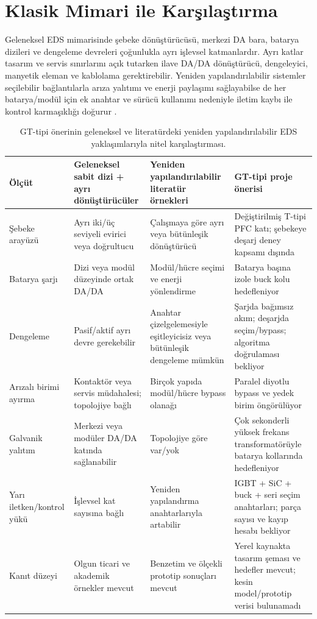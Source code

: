 \section{Klasik Mimari ile Karşılaştırma}
\label{sec:gt-karsilastirma}

Geleneksel EDS mimarisinde şebeke dönüştürücüsü, merkezi DA bara, batarya dizileri ve dengeleme devreleri çoğunlukla ayrı işlevsel katmanlardır. Ayrı katlar tasarım ve servis sınırlarını açık tutarken ilave DA/DA dönüştürücü, dengeleyici, manyetik eleman ve kablolama gerektirebilir. Yeniden yapılandırılabilir sistemler seçilebilir bağlantılarla arıza yalıtımı ve enerji paylaşımı sağlayabilse de her batarya/modül için ek anahtar ve sürücü kullanımı nedeniyle iletim kaybı ile kontrol karmaşıklığı doğurur \citep{Momayyezan2016,Farakhor2023,Huang2024}.

\begin{table}[htbp]
  \centering
  \caption{GT-tipi önerinin geleneksel ve literatürdeki yeniden yapılandırılabilir EDS yaklaşımlarıyla nitel karşılaştırması.}
  \label{tab:gt-mimari-karsilastirma}
  \footnotesize
  \begin{tabularx}{\textwidth}{@{}p{}p{}p{}X@{}}
    \toprule
    Ölçüt & Geleneksel sabit dizi + ayrı dönüştürücüler & Yeniden yapılandırılabilir literatür örnekleri & GT-tipi proje önerisi \\
    \midrule
    Şebeke arayüzü & Ayrı iki/üç seviyeli evirici veya doğrultucu & Çalışmaya göre ayrı veya bütünleşik dönüştürücü & Değiştirilmiş T-tipi PFC katı; şebekeye deşarj deney kapsamı dışında \\
    Batarya şarjı & Dizi veya modül düzeyinde ortak DA/DA & Modül/hücre seçimi ve enerji yönlendirme & Batarya başına izole buck kolu hedefleniyor \\
    Dengeleme & Pasif/aktif ayrı devre gerekebilir & Anahtar çizelgelemesiyle eşitleyicisiz veya bütünleşik dengeleme mümkün & Şarjda bağımsız akım; deşarjda seçim/bypass; algoritma doğrulaması bekliyor \\
    Arızalı birimi ayırma & Kontaktör veya servis müdahalesi; topolojiye bağlı & Birçok yapıda modül/hücre bypass olanağı & Paralel diyotlu bypass ve yedek birim öngörülüyor \\
    Galvanik yalıtım & Merkezi veya modüler DA/DA katında sağlanabilir & Topolojiye göre var/yok & Çok sekonderli yüksek frekans transformatörüyle batarya kollarında hedefleniyor \\
    Yarı iletken/kontrol yükü & İşlevsel kat sayısına bağlı & Yeniden yapılandırma anahtarlarıyla artabilir & IGBT + SiC + buck + seri seçim anahtarları; parça sayısı ve kayıp hesabı bekliyor \\
    Kanıt düzeyi & Olgun ticari ve akademik örnekler mevcut & Benzetim ve ölçekli prototip sonuçları mevcut \citep{Momayyezan2016,Farakhor2023,Huang2024} & Yerel kaynakta tasarım şeması ve hedefler mevcut; kesin model/prototip verisi bulunamadı \\
    \bottomrule
  \end{tabularx}
\end{table}

